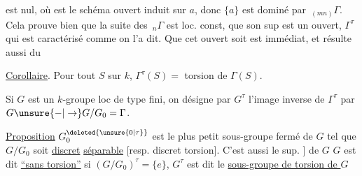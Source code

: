 est nul, où  est le schéma ouvert
induit sur $a$, donc $\{a\}$ est dominé
par $\,{}_{(mn)}\Gamma$. Cela prouve bien que
la suite des $\,{}_n\Gamma$ est loc. const, que son
sup est un ouvert, $\Gamma^\tau$ qui est caractérisé
comme on l'a dit. Que cet ouvert
soit  est immédiat, et résulte aussi du

 \uline{Corollaire}. Pour tout $S$  sur $k$,
$\Gamma^\tau(S)={}$ torsion de $\Gamma(S)$. 


Si $G$ est un  $k$-groupe
 loc de type fini, on
désigne par $G^\tau$ l'image inverse de
$\Gamma^\tau$ par $G\unsure{-|\to}G/G_0=\Gamma$.

\uline{Proposition} $G^{\deleted{\unsure{0|\tau}}}_0$  est le plus petit sous-groupe
fermé de $G$ tel que $G/G_0$ soit
\uline{discret} \uline{séparable} [resp. discret 
torsion]. C'est aussi le sup. \inserted{\unsure{(croissant)|croissant)} des sous-groupes [ouverts; \unsure{ou : ouvert} \unsure{``\quad''} }]
de $G$    
$G$ est dit \uline{``sans torsion''} si
$(G/G_0)^\tau=\{e\}$,  $G^\tau$ est dit le
\uline{sous-groupe de torsion de $G$}
